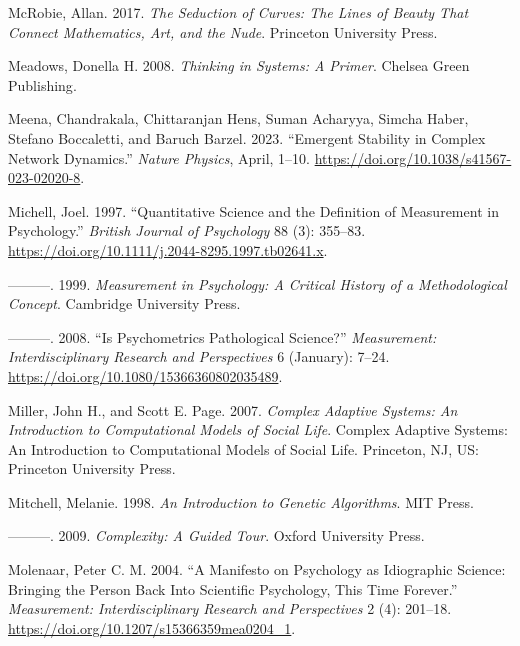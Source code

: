 \documentclass[
  a4paper,
  DIV=11,
  numbers=noendperiod,
  oneside]{scrreprt}
\newlength{\cslhangindent}
\newenvironment{CSLReferences}[2] %
 {\begin{list}{}{%
  \setlength{\itemindent}{0pt}
  \setlength{\leftmargin}{0pt}
  \setlength{\parsep}{0pt}
  \ifodd #1
   \setlength{\leftmargin}{\cslhangindent}
   \setlength{\itemindent}{-1\cslhangindent}
  \fi
  \setlength{\itemsep}{#2\baselineskip}}}
 {\end{list}}
\begin{document}
\begin{CSLReferences}{1}{0}
McRobie, Allan. 2017. \emph{The {Seduction} of {Curves}: {The Lines} of
{Beauty That Connect Mathematics}, {Art}, and the {Nude}}. {Princeton
University Press}.

Meadows, Donella H. 2008. \emph{Thinking in {Systems}: {A Primer}}.
{Chelsea Green Publishing}.

Meena, Chandrakala, Chittaranjan Hens, Suman Acharyya, Simcha Haber,
Stefano Boccaletti, and Baruch Barzel. 2023. {``Emergent Stability in
Complex Network Dynamics.''} \emph{Nature Physics}, April, 1--10.
\url{https://doi.org/10.1038/s41567-023-02020-8}.

Michell, Joel. 1997. {``Quantitative Science and the Definition of
Measurement in Psychology.''} \emph{British Journal of Psychology} 88
(3): 355--83. \url{https://doi.org/10.1111/j.2044-8295.1997.tb02641.x}.

---------. 1999. \emph{Measurement in {Psychology}: {A Critical History}
of a {Methodological Concept}}. {Cambridge University Press}.

---------. 2008. {``Is {Psychometrics Pathological Science}?''}
\emph{Measurement: Interdisciplinary Research and Perspectives} 6
(January): 7--24. \url{https://doi.org/10.1080/15366360802035489}.

Miller, John H., and Scott E. Page. 2007. \emph{Complex Adaptive
Systems: {An} Introduction to Computational Models of Social Life}.
Complex Adaptive Systems: {An} Introduction to Computational Models of
Social Life. {Princeton, NJ, US}: {Princeton University Press}.

Mitchell, Melanie. 1998. \emph{An {Introduction} to {Genetic
Algorithms}}. {MIT Press}.

---------. 2009. \emph{Complexity: {A Guided Tour}}. {Oxford University
Press}.

Molenaar, Peter C. M. 2004. {``A {Manifesto} on {Psychology} as
{Idiographic Science}: {Bringing} the {Person Back Into Scientific
Psychology}, {This Time Forever}.''} \emph{Measurement:
Interdisciplinary Research and Perspectives} 2 (4): 201--18.
\url{https://doi.org/10.1207/s15366359mea0204_1}.


\end{CSLReferences}
\end{document}
